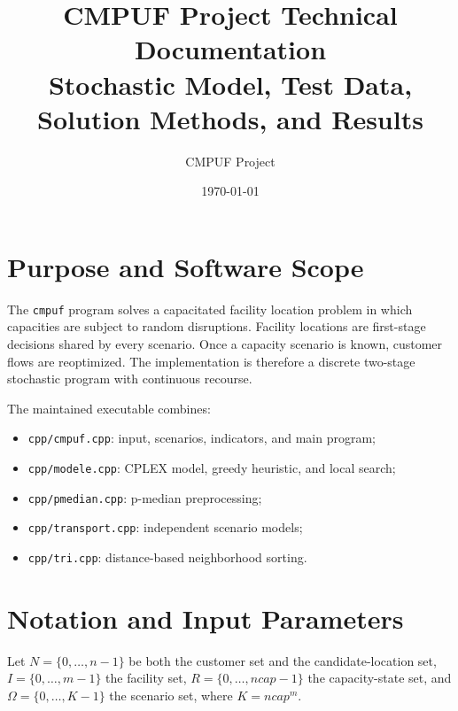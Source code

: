 \documentclass[11pt,a4paper]{article}
\title{CMPUF Project Technical Documentation\\
\large Stochastic Model, Test Data, Solution Methods, and Results}
\author{CMPUF Project}
\date{\today}
\newcommand{\code}[1]{\texttt{#1}}
\begin{document}
\maketitle
\tableofcontents
\newpage

\section{Purpose and Software Scope}

The \code{cmpuf} program solves a capacitated facility location problem in
which capacities are subject to random disruptions. Facility locations are
first-stage decisions shared by every scenario. Once a capacity scenario is
known, customer flows are reoptimized. The implementation is therefore a
discrete two-stage stochastic program with continuous recourse.

The maintained executable combines:
\begin{itemize}
\item \code{cpp/cmpuf.cpp}: input, scenarios, indicators, and main program;
\item \code{cpp/modele.cpp}: CPLEX model, greedy heuristic, and local search;
\item \code{cpp/pmedian.cpp}: p-median preprocessing;
\item \code{cpp/transport.cpp}: independent scenario models;
\item \code{cpp/tri.cpp}: distance-based neighborhood sorting.
\end{itemize}

\section{Notation and Input Parameters}

Let $N=\{0,\ldots,n-1\}$ be both the customer set and the candidate-location
set, $I=\{0,\ldots,m-1\}$ the facility set,
$R=\{0,\ldots,ncap-1\}$ the capacity-state set, and
$\Omega=\{0,\ldots,K-1\}$ the scenario set, where $K=ncap^m$.
\end{document}
